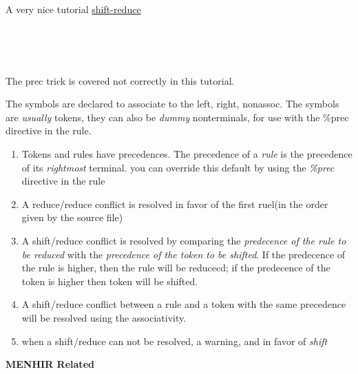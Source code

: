 A very nice tutorial
\href{http://www.cs.uiuc.edu/class/sp10/cs421/lectures/lecture%2010%20supp.pdf}{shift-reduce}

\inputminted{ocaml}{code/shift_reduce/s1.mly}
\inputminted{ocaml}{code/shift_reduce/s2.mly}
\inputminted{ocaml}{code/shift_reduce/s3.mly}
\inputminted{ocaml}{code/shift_reduce/s4.mly}
\inputminted{ocaml}{code/shift_reduce/s5.mly}

The prec trick is covered not correctly in this tutorial.
        
The symbols are declared to associate to the left, right,
nonassoc. The symbols are \textit{usually} tokens, they can
also be \textit{dummy} nonterminals, for use with the \%prec
directive in the rule.

\begin{enumerate}
\item Tokens and rules have precedences. The precedence of a
\textit{rule} is the precedence of its \textit{rightmost}
terminal. you can override this default by using the \textit{\%prec}
directive in the rule
\item A reduce/reduce conflict is resolved in favor of the first
ruel(in the order given by the source file)
\item A shift/reduce conflict is resolved by comparing the
\textit{predecence of the rule to be reduced} with the
\textit{precedence of the token to be shifted}. If the predecence of
the rule is higher, then the rule will be reducecd; if the predecence
of the token is higher then token will be shifted.
\item A shift/reduce conflict between a rule and a token with
the same precedence will be resolved using the associativity.
\item when a shift/reduce can not be resolved, a warning, and
in favor of \textit{shift}
\end{enumerate}


\textbf{MENHIR Related}

